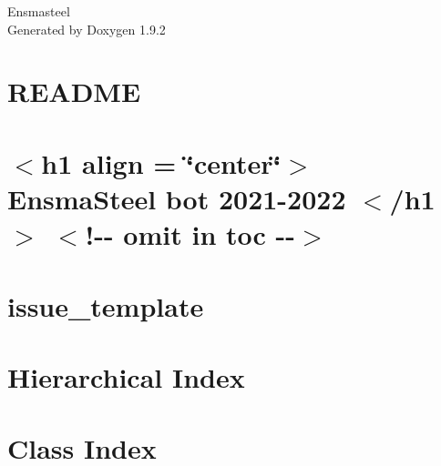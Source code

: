 \documentclass[twoside]{book}
\newcommand{\+}{\discretionary{\mbox{\scriptsize$\hookleftarrow$}}{}{}}
\newcommand{\clearemptydoublepage}{%
    \newpage{\pagestyle{empty}\cleardoublepage}%
  }
\begin{document}
  \raggedbottom
    \hypersetup{pageanchor=false,
                bookmarksnumbered=true,
                pdfencoding=unicode
               }
  \begin{titlepage}
  \vspace*{7cm}
  \begin{center}%
  {\Large Ensmasteel}\\
  \vspace*{1cm}
  {\large Generated by Doxygen 1.9.2}\\
  \end{center}
  \end{titlepage}
  \clearemptydoublepage
  \tableofcontents
  \clearemptydoublepage
  \hypersetup{pageanchor=true}
\chapter{README}
\label{md__ensmasteel__bot_2020__arduino__mega__lib__stepper_driver__r_e_a_d_m_e}

\chapter{\texorpdfstring{$<$}{<}h1 align = \char`\"{}center\char`\"{}\texorpdfstring{$>$}{>} Ensma\+Steel bot 2021-\/2022 \texorpdfstring{$<$}{<}/h1\texorpdfstring{$>$}{>} \texorpdfstring{$<$}{<}!-\/-\/ omit in toc -\/-\/\texorpdfstring{$>$}{>}}
\label{md__ensmasteel__bot_2020__r_e_a_d_m_e}

\chapter{issue\+\_\+template}
\label{md__ensmasteel__bot_2020__teensy_lib__encoder_docs_issue_template}

\chapter{Hierarchical Index}

\chapter{Class Index}

\end{document}
